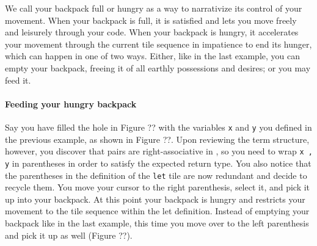 
We call your backpack full or hungry as a way
to narrativize its control of your movement.
When your backpack is full, it is satisfied
and lets you move freely and leisurely through
your code.
When your backpack is hungry, it accelerates your
movement through the current tile sequence
in impatience to end its hunger, which can happen in one of two ways.
Either, like in the last example, you can empty your backpack,
freeing it of all earthly possessions and desires;
or you may feed it.




\paragraph{Feeding your hungry backpack}
Say you have filled the hole in Figure ?? with
the variables \texttt{x} and \texttt{y} you defined
in the previous example, as shown in Figure ??.
Upon reviewing the term structure, however, you
discover that pairs are right-associative in \tylr,
so you need to wrap \texttt{x , y} in parentheses
in order to satisfy the expected return type.
You also notice that the parentheses in the definition
of the \texttt{let} tile are now redundant
and decide to recycle them.
You move your cursor to the right parenthesis,
select it, and pick it up into your backpack.
At this point your backpack is hungry and restricts
your movement to the tile sequence within the
let definition.
Instead of emptying your backpack like in the
last example, this time you move over to the
left parenthesis and pick it up as well (Figure ??).

